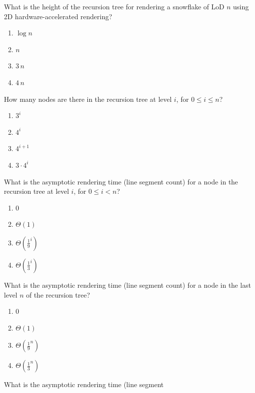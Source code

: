 \documentclass[12pt,twoside]{article}
\begin{document}
\begin{problems}
\begin{problemparts}
  \problempart {} What is the height of the recursion tree for rendering
  a snowflake of LoD $n$ using 2D hardware-accelerated rendering?
    \begin{enumerate}
      \item $\log n$
      \item $n$
      \item $3 \, n$
      \item $4 \, n$
    \end{enumerate}
  \problempart {} How many nodes are there in the recursion tree at
  level $i$, for $0 \le i \le n$?
    \begin{enumerate}
      \item $3 ^ i$
      \item $4 ^ i$
      \item $4 ^ {i + 1}$
      \item $3 \cdot 4 ^ i$
    \end{enumerate}
  \problempart {} What is the asymptotic rendering time (line segment
  count) for a node in the recursion tree at level $i$, for $0 \le i < n$?
    \begin{enumerate}
      \item $0$
      \item $\Theta(1)$
      \item $\Theta(\frac{1}{9}^i)$
      \item $\Theta(\frac{1}{3}^i)$
    \end{enumerate}
  \problempart {} What is the asymptotic rendering time (line segment
  count) for a node in the last level $n$ of the recursion tree?
    \begin{enumerate}
      \item $0$
      \item $\Theta(1)$
      \item $\Theta(\frac{1}{9}^n)$
      \item $\Theta(\frac{1}{3}^n)$
    \end{enumerate}
  \problempart {} What is the asymptotic rendering time (line segment

\end{problemparts}
\end{problems}
\end{document}
